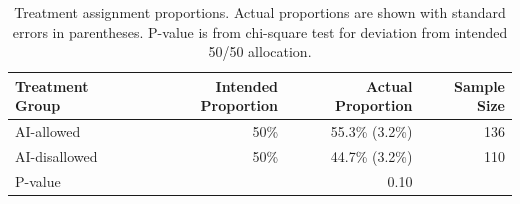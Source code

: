 \begin{table}[htbp]
\centering \small
\begin{tabular}{lrrr}
\toprule
Treatment Group & Intended Proportion & Actual Proportion & Sample Size \\
\midrule
AI-allowed & 50\% & 55.3\% (3.2\%) & 136 \\
AI-disallowed & 50\% & 44.7\% (3.2\%) & 110 \\
\midrule
P-value & & 0.10 & \\
\bottomrule
\end{tabular}
\caption{Treatment assignment proportions. Actual proportions are shown with standard errors in parentheses. P-value is from chi-square test for deviation from intended 50/50 allocation.}
\label{tab:treatment_proportions}
\end{table}
